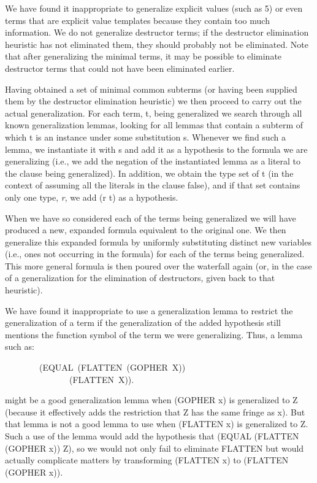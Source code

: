\documentclass[10pt]{book}
\newenvironment{pubasis}{\begin{flushleft}}{\end{flushleft}}
\begin{document}
We have found it inappropriate to generalize explicit values (such as 5)
or even terms that are explicit value templates
because they contain
too much information.  We do not generalize destructor
terms; if the destructor elimination heuristic has not
eliminated them, they should probably not be eliminated.
Note that after generalizing the minimal terms,
it may be possible to eliminate destructor terms that
could not have been eliminated earlier.

Having obtained a set of minimal common subterms (or having been
supplied them by the  destructor elimination heuristic) we then proceed
to carry out the actual generalization.  For each term, t,
being generalized we search through all known generalization lemmas, looking
for all lemmas that contain a subterm of which t is
an instance under some substitution s.
Whenever we find such a lemma, we instantiate
it with s and add it as a hypothesis to the formula
we are generalizing (i.e., we add the negation of the instantiated lemma
as a literal to the clause being generalized).  In addition, we obtain the
type set of t (in the context of assuming all the literals in
the clause false), and if that set contains only one
type, \emph{r}, we add (r t) as a hypothesis.

When we have so considered each of the terms being generalized we will have
produced a new, expanded formula equivalent to the original one.
We then generalize this expanded formula by uniformly
substituting distinct 
new variables (i.e., ones not occurring in the formula) for
each of the terms being generalized.  This more general formula is then poured over the
waterfall again (or, in the case of a generalization for the elimination of
destructors, given back to that heuristic).

We have found it inappropriate to use a generalization lemma
to restrict the generalization of a term if the 
generalization of the added hypothesis 
still mentions the function symbol of the term we were generalizing.
Thus,  a lemma such as:
\begin{pubasis}
~~~~~~~~(EQUAL~(FLATTEN~(GOPHER~X))\\
~~~~~~~~~~~~~~~(FLATTEN~X)).\\
\end{pubasis}
might be a good generalization lemma when (GOPHER x) is generalized to Z
(because it effectively adds the restriction that Z
has the same fringe as x).  But that lemma is not
a good lemma to use when  (FLATTEN x) is generalized to Z.
Such a use of the lemma would add the hypothesis
that (EQUAL (FLATTEN (GOPHER x)) Z), so we would not only fail to eliminate FLATTEN but
would actually complicate matters by transforming (FLATTEN x) to
(FLATTEN (GOPHER x)).
\end{document}
